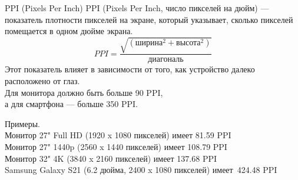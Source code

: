 \documentclass{beamer}
\begin{document}
		
		

		

	\begin{frame}{PPI (Pixels Per Inch)}
		PPI (Pixels Per Inch, число пикселей на дюйм) --- показатель плотности пикселей на экране, который указывает, сколько пикселей помещается в одном дюйме экрана. 
		\[
		PPI = \frac{\sqrt{(\text{ширина}^2 + \text{высота}^2)}}{\text{диагональ}}
		\]
		Этот показатель влияет в зависимости от того, как устройство далеко расположено от глаз.\\  
		Для монитора должно быть больше 90 PPI,\\ а для смартфона --- больше 350 PPI.

		{\footnotesize
		Примеры. \\
		Монитор 27" Full HD (1920 x 1080 пикселей) имеет 81.59 PPI\\
		Монитор 27" 1440p (2560 x 1440 пикселей) имеет 108.79 PPI\\
		Монитор 32" 4K (3840 x 2160 пикселей) имеет 137.68 PPI\\
		Samsung Galaxy S21 (6.2 дюйма, 2400 x 1080 пикселей) имеет~424.48 PPI\\
		}
\end{frame}
\end{document}
